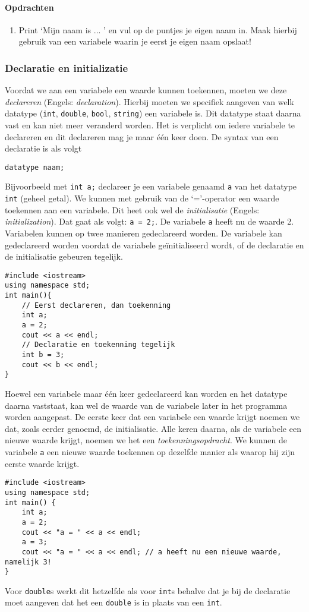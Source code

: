 \documentclass[12pt,a4paper]{article}
\newcommand{\icode}{\lstinline}
\begin{document}
\paragraph{Opdrachten}
\begin{enumerate} 
\item 
Print `Mijn naam is ... ' en vul op de puntjes je eigen naam in. Maak hierbij gebruik van een variabele waarin je eerst je eigen naam opslaat! 
\end{enumerate} 

\subsubsection{Declaratie en initializatie}
Voordat we aan een variabele een waarde kunnen toekennen, moeten we deze \emph{declareren} (Engels: \emph{declaration}). 
Hierbij moeten we specifiek aangeven van welk datatype (\icode{int}, \icode{double}, \icode{bool}, 
\icode{string}) een variabele is. Dit datatype staat daarna vast en kan niet meer veranderd worden.
Het is verplicht om iedere variabele te declareren en dit declareren mag je maar één keer doen. 
De syntax van een declaratie is als volgt

\icode{datatype naam;} 

Bijvoorbeeld met \icode{int a;} declareer je een variabele genaamd \icode{a} van het datatype 
\icode{int} (geheel getal). We kunnen met gebruik van de `='-operator een waarde toekennen aan een variabele. Dit heet ook wel de \emph{initialisatie} (Engels: \emph{initialization}).
Dat gaat als volgt: \icode{a = 2;}. De variabele \icode{a} heeft nu de waarde 2.
Variabelen kunnen op twee manieren gedeclareerd worden. De variabele kan gedeclareerd worden 
voordat de variabele ge\"initialiseerd wordt, of de declaratie en de initialisatie gebeuren tegelijk. 
\begin{lstlisting}
#include <iostream> 
using namespace std; 
int main(){
	// Eerst declareren, dan toekenning 
	int a; 
	a = 2; 
	cout << a << endl; 
	// Declaratie en toekenning tegelijk
	int b = 3; 
	cout << b << endl; 
}
\end{lstlisting}
Hoewel een variabele maar één keer gedeclareerd kan worden en het datatype daarna vaststaat, kan 
wel de waarde van de variabele later in het programma worden aangepast. De eerste keer dat een variabele een waarde krijgt noemen we dat, zoals eerder genoemd, de initialisatie. Alle keren daarna, als de variabele een nieuwe waarde krijgt, noemen we het een \emph{toekenningsopdracht}. We kunnen de variabele \icode{a} een nieuwe waarde toekennen op dezelfde manier als waarop hij zijn eerste waarde krijgt. 
\begin{lstlisting}
#include <iostream> 
using namespace std;
int main() {
	int a; 
	a = 2; 
	cout << "a = " << a << endl; 
	a = 3; 
	cout << "a = " << a << endl; // a heeft nu een nieuwe waarde, namelijk 3! 
}
\end{lstlisting}
Voor \icode{double}s werkt dit hetzelfde als voor \icode{int}s behalve dat je bij de declaratie moet 
aangeven dat het een \icode{double} is in plaats van een \icode{int}. 
\end{document}
